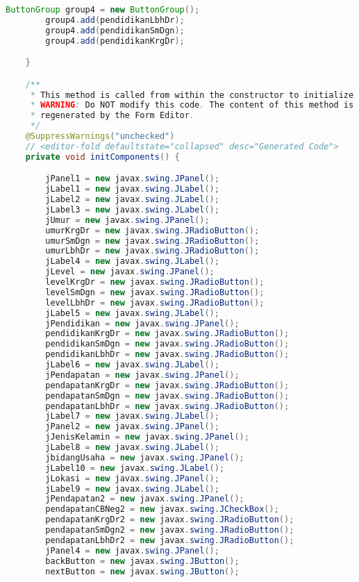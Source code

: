 \begin{lstlisting}[language=Java, caption=TampilanKondisiKetetanggaan.java]
        ButtonGroup group4 = new ButtonGroup();
        group4.add(pendidikanLbhDr);
        group4.add(pendidikanSmDgn);
        group4.add(pendidikanKrgDr);

    }

    /**
     * This method is called from within the constructor to initialize the form.
     * WARNING: Do NOT modify this code. The content of this method is always
     * regenerated by the Form Editor.
     */
    @SuppressWarnings("unchecked")
    // <editor-fold defaultstate="collapsed" desc="Generated Code">                          
    private void initComponents() {

        jPanel1 = new javax.swing.JPanel();
        jLabel1 = new javax.swing.JLabel();
        jLabel2 = new javax.swing.JLabel();
        jLabel3 = new javax.swing.JLabel();
        jUmur = new javax.swing.JPanel();
        umurKrgDr = new javax.swing.JRadioButton();
        umurSmDgn = new javax.swing.JRadioButton();
        umurLbhDr = new javax.swing.JRadioButton();
        jLabel4 = new javax.swing.JLabel();
        jLevel = new javax.swing.JPanel();
        levelKrgDr = new javax.swing.JRadioButton();
        levelSmDgn = new javax.swing.JRadioButton();
        levelLbhDr = new javax.swing.JRadioButton();
        jLabel5 = new javax.swing.JLabel();
        jPendidikan = new javax.swing.JPanel();
        pendidikanKrgDr = new javax.swing.JRadioButton();
        pendidikanSmDgn = new javax.swing.JRadioButton();
        pendidikanLbhDr = new javax.swing.JRadioButton();
        jLabel6 = new javax.swing.JLabel();
        jPendapatan = new javax.swing.JPanel();
        pendapatanKrgDr = new javax.swing.JRadioButton();
        pendapatanSmDgn = new javax.swing.JRadioButton();
        pendapatanLbhDr = new javax.swing.JRadioButton();
        jLabel7 = new javax.swing.JLabel();
        jPanel2 = new javax.swing.JPanel();
        jJenisKelamin = new javax.swing.JPanel();
        jLabel8 = new javax.swing.JLabel();
        jbidangUsaha = new javax.swing.JPanel();
        jLabel10 = new javax.swing.JLabel();
        jLokasi = new javax.swing.JPanel();
        jLabel9 = new javax.swing.JLabel();
        jPendapatan2 = new javax.swing.JPanel();
        pendapatanCBNeg2 = new javax.swing.JCheckBox();
        pendapatanKrgDr2 = new javax.swing.JRadioButton();
        pendapatanSmDgn2 = new javax.swing.JRadioButton();
        pendapatanLbhDr2 = new javax.swing.JRadioButton();
        jPanel4 = new javax.swing.JPanel();
        backButton = new javax.swing.JButton();
        nextButton = new javax.swing.JButton();


\end{lstlisting}
